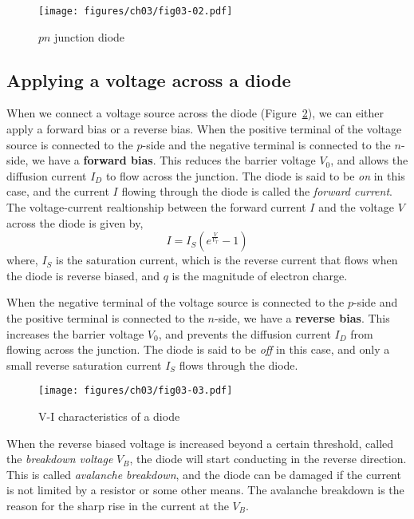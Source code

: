 \begin{figure}[t]
    \centering
    \texttt{[image: figures/ch03/fig03-02.pdf]}
    \caption{$pn$ junction diode}
    \label{fig:03-02}
\end{figure}

\subsection{Applying a voltage across a diode}
When we connect a voltage source across the diode (Figure~\ref{fig:03-diode-vi}), we can either apply a forward bias or a reverse bias. When the positive terminal of the voltage source is connected to the $p$-side and the negative terminal is connected to the $n$-side, we have a \textbf{forward bias}. This reduces the barrier voltage $V_0$, and allows the diffusion current $I_D$ to flow across the junction. The diode is said to be \textit{on} in this case, and the current $I$ flowing through the diode is called the \textit{forward current}. The voltage-current realtionship between the forward current $I$ and the voltage $V$ across the diode is given by,
\begin{equation}
    I = I_S \left( e^{\frac{V}{V_T}} - 1 \right)
    \label{eq:ch03-forward-bias-vi}
\end{equation}
where, $I_S$ is the saturation current, which is the reverse current that flows when the diode is reverse biased, and $q$ is the magnitude of electron charge.

When the negative terminal of the voltage source is connected to the $p$-side and the positive terminal is connected to the $n$-side, we have a \textbf{reverse bias}. This increases the barrier voltage $V_0$, and prevents the diffusion current $I_D$ from flowing across the junction. The diode is said to be \textit{off} in this case, and only a small reverse saturation current $I_S$ flows through the diode.
\begin{figure}[t]
    \centering
    \texttt{[image: figures/ch03/fig03-03.pdf]}
    \caption{V-I characteristics of a diode}
    \label{fig:03-diode-vi}
\end{figure}
When the reverse biased voltage is increased beyond a certain threshold, called the \textit{breakdown voltage} $V_B$, the diode will start conducting in the reverse direction. This is called \textit{avalanche breakdown}, and the diode can be damaged if the current is not limited by a resistor or some other means. The avalanche breakdown is the reason for the sharp rise in the current at the $V_B$.

